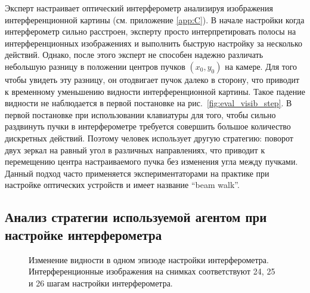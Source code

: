 Эксперт настраивает оптический интерферометр анализируя изображения интерференционной картины (см. приложение \ref{app:C}). В начале настройки когда интерферометр сильно расстроен, эксперту просто интерпретировать полосы на интерференционных изображениях и выполнить быструю настройку за несколько действий. Однако, после этого эксперт не способен надежно различать небольшую разницу в положении центров пучков $(x_0,y_0)$ на камере. Для того чтобы увидеть эту разницу, он отодвигает пучок далеко в сторону, что приводит к временному уменьшению видности интерференционной картины. Такое падение видности не наблюдается в первой постановке на рис.~\ref{fig:eval_visib_step}. В первой постановке при использовании клавиатуры для того, чтобы сильно раздвинуть пучки в интерферометре  требуется совершить большое количество дискретных действий. Поэтому человек использует другую стратегию: поворот двух зеркал на равный угол в различных направлениях, что приводит к перемещению центра настраиваемого пучка без изменения угла между пучками. Данный подход часто применяется экспериментаторами на практике при настройке оптических устройств и имеет название ``beam walk''. 


\subsection{Анализ стратегии используемой агентом при настройке интерферометра}

\begin{figure}[ht]
\caption{Изменение видности в одном эпизоде настройки интерферометра. Интерференционные изображения на снимках соответствуют 24, 25 и 26 шагам настройки интерферометра. 
}
\label{fig:anal_visib_step}
\end{figure}

